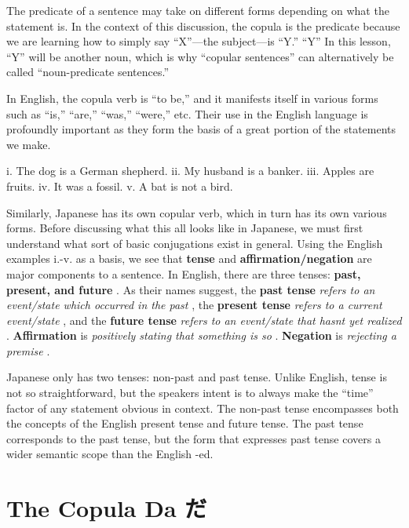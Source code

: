 \par{ The predicate of a sentence may take on different forms depending on what the statement is. In the context of this discussion, the copula is the predicate because we are learning how to simply say “X”—the subject—is “Y.” “Y” In this lesson, “Y” will be another noun, which is why “copular sentences” can alternatively be called “noun-predicate sentences.” }
 
\par{ In English, the copula verb is “to be,” and it manifests itself in various forms such as “is,” “are,” “was,” “were,” etc. Their use in the English language is profoundly important as they form the basis of a great portion of the statements we make. }
 
\par{i. The dog is a German shepherd. \hfill\break
ii. My husband is a banker. \hfill\break
iii. Apples are fruits. \hfill\break
iv. It was a fossil. \hfill\break
v. A bat is not a bird. }
 
\par{ Similarly, Japanese has its own copular verb, which in turn has its own various forms. Before discussing what this all looks like in Japanese, we must first understand what sort of basic conjugations exist in general. Using the English examples i.-v. as a basis, we see that \textbf{tense }and \textbf{affirmation\slash negation }are major components to a sentence. In English, there are three tenses: \textbf{past, present, and future }. As their names suggest, the \textbf{past tense } \emph{refers to an event\slash state which occurred in the past }, the \textbf{present tense } \emph{refers to a current event\slash state }, and the \textbf{future tense } \emph{refers to an event\slash state that hasn\textquotesingle t yet realized }. \textbf{Affirmation }is \emph{positively stating that something is so }. \textbf{Negation }is \emph{rejecting a premise }. }
 
\par{ Japanese only has two tenses: non-past and past tense. Unlike English, tense is not so straightforward, but the speaker\textquotesingle s intent is to always make the “time” factor of any statement obvious in context. The non-past tense encompasses both the concepts of the English present tense and future tense. The past tense corresponds to the past tense, but the form that expresses past tense covers a wider semantic scope than the English -ed. }
      
\section{The Copula Da だ}
 
